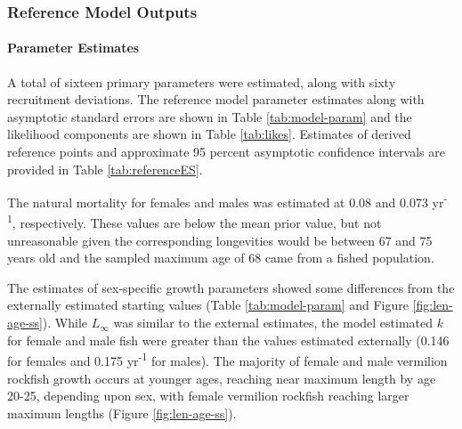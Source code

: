 \documentclass[11pt,
  english,
  a4paper,
]{article}
\begin{document}
\hypertarget{reference-model-outputs}{%
\subsubsection{Reference Model Outputs}\label{reference-model-outputs}}

\leavevmode\tagmcend\tagstructend


\hypertarget{parameter-estimates}{%
\paragraph{Parameter Estimates}\label{parameter-estimates}}

\leavevmode\tagmcend\tagstructend


A total of sixteen primary parameters were estimated, along with sixty recruitment deviations. The reference model parameter estimates along with asymptotic standard errors are shown in Table \ref{tab:model-param} and the likelihood components are shown in Table \ref{tab:likes}. Estimates of derived reference points and approximate 95 percent asymptotic confidence intervals are provided in Table \ref{tab:referenceES}.

\leavevmode\tagmcend\tagstructend\par


The natural mortality for females and males was estimated at 0.08 and 0.073 yr\textsuperscript{-1}, respectively. These values are below the mean prior value, but not unreasonable given the corresponding longevities would be between 67 and 75 years old and the sampled maximum age of 68 came from a fished population.

\leavevmode\tagmcend\tagstructend\par


The estimates of sex-specific growth parameters showed some differences from the externally estimated starting values (Table \ref{tab:model-param} and Figure \ref{fig:len-age-ss}). While {\(L_{\infty}\)\leavevmode\tagmcend\tagstructend} was similar to the external estimates, the model estimated {\(k\)\leavevmode\tagmcend\tagstructend} for female and male fish were greater than the values estimated externally (0.146 for females and 0.175 yr\textsuperscript{-1} for males). The majority of female and male vermilion rockfish growth occurs at younger ages, reaching near maximum length by age 20-25, depending upon sex, with female vermilion rockfish reaching larger maximum lengths (Figure \ref{fig:len-age-ss}).
\end{document}
